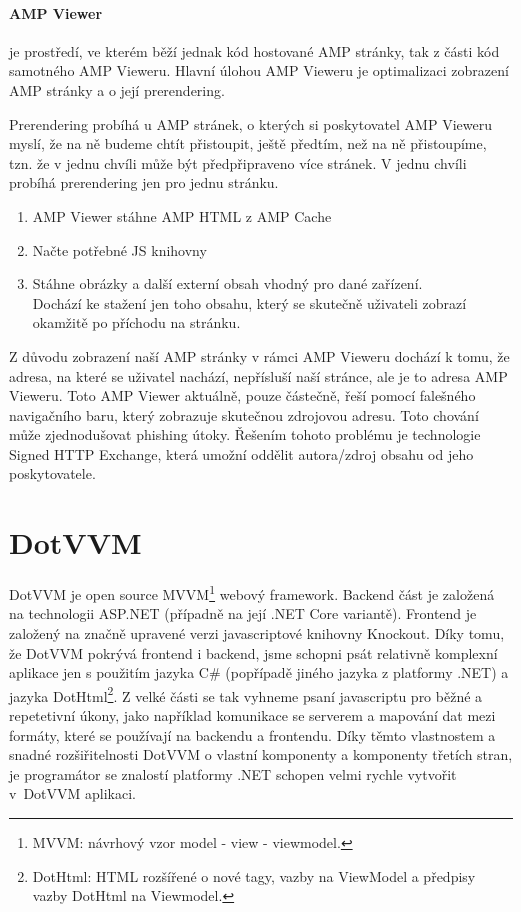 \subsubsection*{AMP Viewer}
 je prostředí, ve kterém běží jednak kód hostované AMP stránky, tak z části kód samotného AMP Vieweru. Hlavní úlohou AMP Vieweru je optimalizaci zobrazení AMP stránky a o její prerendering.

Prerendering probíhá u AMP stránek, o kterých si poskytovatel AMP Vieweru myslí, že na ně budeme chtít přistoupit, ještě předtím, než na ně přistoupíme, tzn. že v jednu chvíli může být předpřipraveno více stránek. V jednu chvíli probíhá prerendering jen pro jednu stránku. 
\begin{gatger}
\begin{enumerate}
    \item AMP Viewer stáhne AMP HTML z AMP Cache
    \item Načte potřebné JS knihovny
    \item Stáhne obrázky a další externí obsah vhodný pro dané zařízení. \\
    Dochází ke stažení jen toho obsahu, který se skutečně uživateli zobrazí okamžitě po příchodu na stránku\cite{ampConf}.
\end{enumerate}
\end{gatger}
Z důvodu zobrazení naší AMP stránky v rámci AMP Vieweru dochází k tomu, že adresa, na které se uživatel nachází, nepřísluší naší stránce, ale je to adresa AMP Vieweru. Toto AMP Viewer aktuálně, pouze částečně, řeší pomocí falešného navigačního baru, který zobrazuje skutečnou zdrojovou adresu. Toto chování může zjednodušovat phishing útoky\cite[Ch.\ 3, p.\ 50]{VzhuruDoAMP}.
Řešením tohoto problému je technologie Signed HTTP Exchange, která umožní oddělit autora/zdroj obsahu od jeho poskytovatele\cite[Ch.\ 3, p.\ 51]{VzhuruDoAMP}.
\chapter{DotVVM}
DotVVM je open source MVVM\footnote{MVVM: návrhový vzor model - view - viewmodel.} webový framework\cite{DotVVMIntro}. Backend část je založená na technologii ASP.NET (případně na její .NET Core variantě). Frontend je založený na značně upravené verzi javascriptové knihovny Knockout. Díky tomu, že DotVVM pokrývá frontend i backend, jsme schopni psát relativně komplexní aplikace jen s použitím jazyka C\# (popřípadě jiného jazyka z platformy .NET) a jazyka DotHtml\footnote{DotHtml: HTML rozšířené o nové tagy, vazby na ViewModel a předpisy vazby DotHtml na Viewmodel.}. Z velké části se tak vyhneme psaní javascriptu pro běžné a repetetivní úkony, jako například komunikace se serverem a mapování dat mezi formáty, které se používají na backendu a frontendu.
Díky těmto vlastnostem a snadné rozšiřitelnosti DotVVM o vlastní komponenty a komponenty třetích stran, je programátor se znalostí platformy .NET schopen velmi rychle vytvořit v~DotVVM aplikaci.

